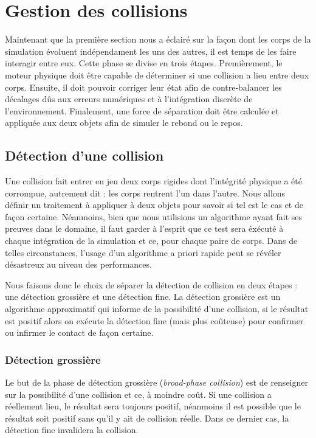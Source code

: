 \section{Gestion des collisions}

Maintenant que la première section nous a éclairé sur la façon dont les corps de la simulation évoluent indépendament les uns des autres, il est temps de les faire interagir entre eux. Cette phase se divise en trois étapes. Premièrement, le moteur physique doit être capable de déterminer si une collision a lieu entre deux corps. Ensuite, il doit pouvoir corriger leur état afin de contre-balancer les décalages dûs aux erreurs numériques et à l'intégration discrète de l'environnement. Finalement, une force de séparation doit être calculée et appliquée aux deux objets afin de simuler le rebond ou le repos.

\subsection{Détection d'une collision}

Une collision fait entrer en jeu deux corps rigides dont l'intégrité physique a été corrompue, autrement dit : les corps rentrent l'un dans l'autre. Nous allons définir un traitement à appliquer à deux objets pour savoir si tel est le cas et de façon certaine. Néanmoins, bien que nous utilisions un algorithme ayant fait ses preuves dans le domaine, il faut garder à l'esprit que ce test sera éxécuté à chaque intégration de la simulation et ce, pour chaque paire de corps. Dans de telles circonstances, l'usage d'un algorithme a priori rapide peut se révéler désastreux au niveau des performances.

Nous faisons donc le choix de séparer la détection de collision en deux étapes : une détection grossière et une détection fine. La détection grossière est un algorithme approximatif qui informe de la possibilité d'une collision, si le résultat est positif alors on exécute la détection fine (mais plus coûteuse) pour confirmer ou infirmer le contact de façon certaine.

\subsubsection{Détection grossière}

Le but de la phase de détection grossière (\textit{broad-phase collision}) est de renseigner sur la possibilité d'une collision et ce, à moindre coût. Si une collision a réellement lieu, le résultat sera toujours positif, néanmoins il est possible que le résultat soit positif sans qu'il y ait de collision réelle. Dans ce dernier cas, la détection fine invalidera la collision.

